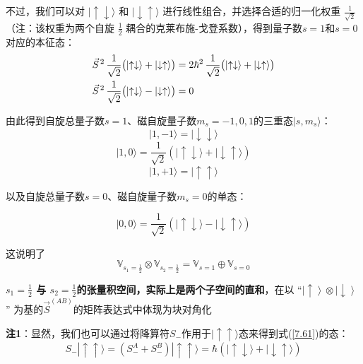 不过，我们可以对 \(|\uparrow\downarrow\rangle\) 和 \(|\downarrow\uparrow\rangle\) 进行线性组合，并选择合适的归一化权重 \(\displaystyle \frac{1}{\sqrt{2}}\)（注：该权重为两个自旋 \(\frac{1}{2}\) 耦合的克莱布施-戈登系数），得到量子数\(s=1\)和\(s=0\)对应的本征态：
\begin{align}
	\vec{S}^{\,2} \, \frac{1}{\sqrt{2}} \bigl( \ket{\uparrow\downarrow} + \ket{\downarrow\uparrow} \bigr) &= 2\hbar^{2} \, \frac{1}{\sqrt{2}} \bigl( \ket{\uparrow\downarrow} + \ket{\downarrow\uparrow} \bigr) \\
	\vec{S}^{\,2} \, \frac{1}{\sqrt{2}} \bigl( \ket{\uparrow\downarrow} - \ket{\downarrow\uparrow} \bigr) &= 0
\end{align}


由此得到自旋总量子数\(s=1\)、磁自旋量子数\(m_s=-1,0,1\)的三重态\(|s,m_s\rangle\)：
\begin{equation}
	|1,-1\rangle = |\downarrow\downarrow\rangle
\end{equation}
\begin{equation}
	|1,0\rangle = \frac{1}{\sqrt{2}}\left(|\uparrow\downarrow\rangle + |\downarrow\uparrow\rangle\right) \label{7.61}
\end{equation}
\begin{equation}
	|1,+1\rangle = |\uparrow\uparrow\rangle \label{7.62}
\end{equation}

以及自旋总量子数\(s=0\)、磁自旋量子数\(m_s=0\)的单态：

\begin{equation}
	|0,0\rangle = \frac{1}{\sqrt{2}}\left(|\uparrow\downarrow\rangle - |\downarrow\uparrow\rangle\right) \label{7.63}
\end{equation}

这说明了
\[
\mathbb{V}_{s_1 = \frac{1}{2}} \otimes \mathbb{V}_{s_2 = \frac{1}{2}} = \mathbb{V}_{s = 1} \oplus \mathbb{V}_{s = 0}
\]

\textbf{\(s_1 = \frac{1}{2}\) 与 \(s_2 = \frac{1}{2}\)的张量积空间，实际上是两个子空间的直和}，在以 ``\(\left|  \uparrow  \right\rangle  \otimes \left|  \downarrow  \right\rangle \)'' 为基的\(\vec{S}^{(AB)}\)的矩阵表达式中体现为块对角化

\textbf{注1}：显然，我们也可以通过将降算符\(S_-\)作用于\(|\uparrow\uparrow\rangle\)态来得到式(\ref{7.61})的态：
\begin{equation}
	S_-|\uparrow\uparrow\rangle = \left(S_-^A + S_-^B\right)|\uparrow\uparrow\rangle = \hbar\left(|\uparrow\downarrow\rangle + |\downarrow\uparrow\rangle\right) \label{7.64}
\end{equation}

